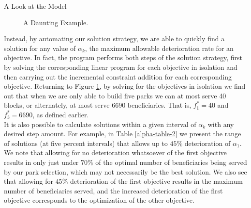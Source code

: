 \documentclass[12pt]{pom_thesis}
\theoremstyle{definition}
\begin{document}
\begin{chapter}{A Look at the Model}
\begin{figure}
\centering
\caption{A Daunting Example.}
\label{bigexample}
\end{figure}

Instead, by automating our solution strategy, we are able to quickly find a solution for any value of $\alpha_k$, the maximum allowable deterioration rate for an objective. In fact, the program performs both steps of the solution strategy, first by solving the corresponding linear program for each objective in isolation and then carrying out the incremental constraint addition for each corresponding objective. Returning to Figure \ref{bigexample}, by solving for the objectives in isolation we find out that when we are only able to build five parks we can at most serve 40 blocks, or alternately, at most serve 6690 beneficiaries. That is, $f_1^* = 40$ and $f_3^* = 6690$, as defined earlier. \\

It is also possible to calculate solutions within a given interval of $\alpha_k$ with any desired step amount. For example, in Table \ref{alpha-table-2} we present the range of solutions (at five percent intervals) that allows up to $45\%$ deterioration of $\alpha_1$. We note that allowing for no deterioration whatsoever of the first objective results in only just under $70\%$ of the optimal number of beneficiaries being served by our park selection, which may not necessarily be the best solution. We also see that allowing for $45\%$ deterioration of the first objective results in the maximum number of beneficiaries served, and the increased deterioration of the first objective corresponds to the optimization of the other objective.\\


\end{chapter}
\end{document}
